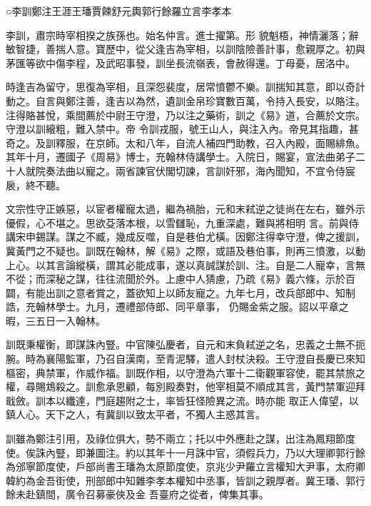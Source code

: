 
\begin{pinyinscope}

 ○李訓鄭注王涯王璠賈餗舒元輿郭行餘羅立言李孝本



 李訓，肅宗時宰相揆之族孫也。始名仲言。進士擢第。形
 貌魁梧，神情灑落；辭敏智捷，善揣人意。寶歷中，從父逢吉為宰相，以訓陰險善計事，愈親厚之。初與茅匯等欲中傷李程，及武昭事發，訓坐長流嶺表，會赦得還。丁母憂，居洛中。



 時逢吉為留守，思復為宰相，且深怨裴度，居常憤鬱不樂。訓揣知其意，即以奇計動之。自言與鄭注善，逢吉以為然，遺訓金帛珍寶數百萬，令持入長安，以賂注。注得賂甚悅，乘間薦於中尉王守澄，乃以注之藥術，訓之《易》道，合薦於文宗。守澄以訓縗粗，難入禁中。帝
 令訓戎服，號王山人，與注入內。帝見其指趣，甚奇之。及訓釋服，在京師。太和八年，自流人補四門助教，召入內殿，面賜緋魚。其年十月，遷國子《周易》博士，充翰林侍講學士。入院日，賜宴，宣法曲弟子二十人就院奏法曲以寵之。兩省諫官伏閣切諫，言訓奸邪，海內聞知，不宜令侍宸扆，終不聽。



 文宗性守正嫉惡，以宦者權寵太過，繼為禍胎，元和末弒逆之徒尚在左右，雖外示優假，心不堪之。思欲芟落本根，以雪讎恥，九重深處，難與將相明
 言。前與侍講宋申錫謀。謀之不臧，幾成反噬，自是巷伯尤橫。因鄭注得幸守澄，俾之援訓，冀黃門之不疑也。訓既在翰林，解《易》之際，或語及巷伯事，則再三憤激，以動上心。以其言論縱橫，謂其必能成事，遂以真誠謀於訓、注。自是二人寵幸，言無不從；而深秘之謀，往往流聞於外。上慮中人猜慮，乃疏《易》義六條，示於百闢，有能出訓之意者賞之，蓋欲知上以師友寵之。九年七月，改兵部郎中、知制誥，充翰林學士。九月，遷禮部侍郎、同平章事，
 仍賜金紫之服。詔以平章之暇，三五日一入翰林。



 訓既秉權衡，即謀誅內豎。中官陳弘慶者，自元和末負弒逆之名，忠義之士無不扼腕。時為襄陽監軍，乃召自漢南，至青泥驛，遣人封杖決殺。王守澄自長慶已來知樞密，典禁軍，作威作福。訓既作相，以守澄為六軍十二衛觀軍容使，罷其禁旅之權，尋賜鴆殺之。訓愈承恩顧，每別殿奏對，他宰相莫不順成其言，黃門禁軍迎拜戢斂。訓本以纖達，門庭趨附之士，率皆狂怪險異之流。時亦能
 取正人偉望，以鎮人心。天下之人，有冀訓以致太平者，不獨人主惑其言。



 訓雖為鄭注引用，及祿位俱大，勢不兩立；托以中外應赴之謀，出注為鳳翔節度使。俟誅內豎，即兼圖注。約以其年十一月誅中官，須假兵力，乃以大理卿郭行餘為邠寧節度使，戶部尚書王璠為太原節度使，京兆少尹羅立言權知大尹事，太府卿韓約為金吾街使，刑部郎中知雜李孝本權知中丞事，皆訓之親厚者。冀王璠、郭行餘未赴鎮間，廣令召募豪俠及金
 吾臺府之從者，俾集其事。




\end{pinyinscope}
